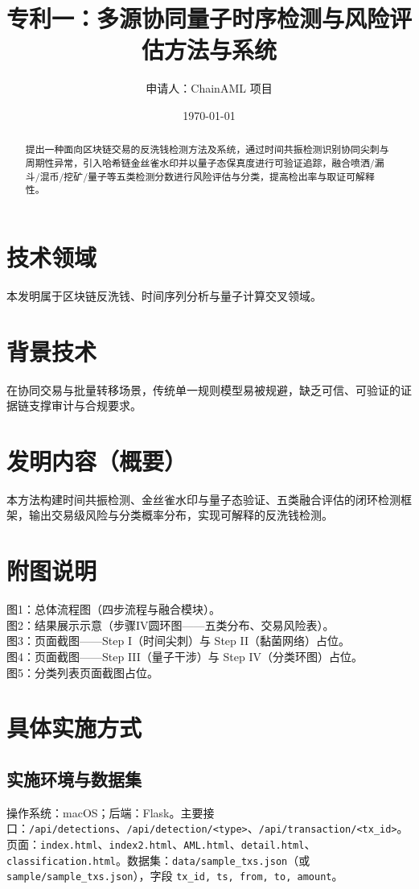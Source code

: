 \documentclass[12pt]{article}
\title{专利一：多源协同量子时序检测与风险评估方法与系统}
\author{申请人：ChainAML 项目}
\date{\today}
\begin{document}
\maketitle

\begin{abstract}
提出一种面向区块链交易的反洗钱检测方法及系统，通过时间共振检测识别协同尖刺与周期性异常，引入哈希链金丝雀水印并以量子态保真度进行可验证追踪，融合喷洒/漏斗/混币/挖矿/量子等五类检测分数进行风险评估与分类，提高检出率与取证可解释性。
\end{abstract}

\section*{技术领域}
本发明属于区块链反洗钱、时间序列分析与量子计算交叉领域。

\section*{背景技术}
在协同交易与批量转移场景，传统单一规则模型易被规避，缺乏可信、可验证的证据链支撑审计与合规要求。

\section*{发明内容（概要）}
本方法构建时间共振检测、金丝雀水印与量子态验证、五类融合评估的闭环检测框架，输出交易级风险与分类概率分布，实现可解释的反洗钱检测。

\section*{附图说明}
图1：总体流程图（四步流程与融合模块）。\\
图2：结果展示示意（步骤IV圆环图——五类分布、交易风险表）。\\
图3：页面截图——Step I（时间尖刺）与 Step II（黏菌网络）占位。\\
图4：页面截图——Step III（量子干涉）与 Step IV（分类环图）占位。\\
图5：分类列表页面截图占位。

\section*{具体实施方式}
\subsection*{实施环境与数据集}
操作系统：macOS；后端：Flask。主要接口：\texttt{/api/detections}、\texttt{/api/detection/<type>}、\texttt{/api/transaction/<tx\_id>}。页面：\texttt{index.html}、\texttt{index2.html}、\texttt{AML.html}、\texttt{detail.html}、\texttt{classification.html}。数据集：\texttt{data/sample\_txs.json}（或 \texttt{sample/sample\_txs.json}），字段 \texttt{tx\_id, ts, from, to, amount}。
\end{document}
